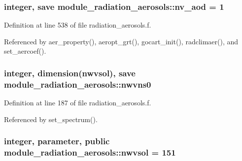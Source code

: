 \subsubsection[{\texorpdfstring{nv\+\_\+aod}{nv_aod}}]{\setlength{\rightskip}{0pt plus 5cm}integer, save module\+\_\+radiation\+\_\+aerosols\+::nv\+\_\+aod = 1\hspace{0.3cm}{\ttfamily [private]}}\hypertarget{group__module__radiation__aerosols_ga112670c954eb372efc017253b1096b17}{}\label{group__module__radiation__aerosols_ga112670c954eb372efc017253b1096b17}


Definition at line 538 of file radiation\+\_\+aerosols.\+f.



Referenced by aer\+\_\+property(), aeropt\+\_\+grt(), gocart\+\_\+init(), radclimaer(), and set\+\_\+aercoef().

\subsubsection[{\texorpdfstring{nwvns0}{nwvns0}}]{\setlength{\rightskip}{0pt plus 5cm}integer, dimension(nwvsol), save module\+\_\+radiation\+\_\+aerosols\+::nwvns0\hspace{0.3cm}{\ttfamily [private]}}\hypertarget{group__module__radiation__aerosols_ga80194c8356dfb92a43306abbe7097711}{}\label{group__module__radiation__aerosols_ga80194c8356dfb92a43306abbe7097711}


Definition at line 187 of file radiation\+\_\+aerosols.\+f.



Referenced by set\+\_\+spectrum().

\subsubsection[{\texorpdfstring{nwvsol}{nwvsol}}]{\setlength{\rightskip}{0pt plus 5cm}integer, parameter, public module\+\_\+radiation\+\_\+aerosols\+::nwvsol = 151}\hypertarget{group__module__radiation__aerosols_ga2e0dc6d161d1906050efd67c471673c9}{}\label{group__module__radiation__aerosols_ga2e0dc6d161d1906050efd67c471673c9}


